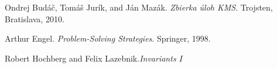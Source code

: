 \documentclass[11pt,a5paper]{article}
\begin{document}
\begin{thebibliography}{9}
 Ondrej Budáč, Tomáš Jurík, and Ján Mazák. \emph{Zbierka úloh KMS}. Trojsten, Bratislava, 2010.

Arthur Engel. \emph{Problem-Solving Strategies}. Springer, 1998.

 Robert Hochberg and Felix Lazebnik.\emph{Invariants $I$}

\end{thebibliography}
\end{document}
